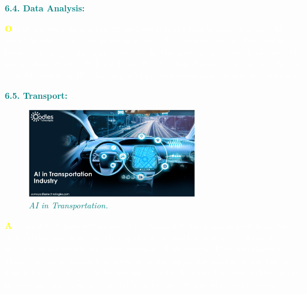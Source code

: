 \documentclass[12pt]{article}
\begin{document}
\begin{large}
\textbf{\textcolor{teal}{6.4. Data Analysis:}}\\
\end{large}
\textcolor{white}{\textbf{\textcolor{yellow}{\huge O}}ne of the ways AI will benefit business is in the field of Data Analysis. AI would be able to perceive patterns in data that humans cannot. This enables business’ to target the right customers for the product. An example of this is the partnership between IBM and Fluid. Fluid, a digital retail company uses Watson – an AI created by IBM for insightful product recommendation to its customers.}\\[5cm]

\begin{large}
\textbf{\textcolor{teal}{6.5. Transport:}}\\
\end{large}

\begin{figure}
\centering
\includegraphics[width=2.9in]{d1acc567-5be1-4738-9b8e-663b8d182bfa}

\caption{\textit{\textcolor{teal}{AI in Transportation.}}}
\end{figure}
\textcolor{white}{\textbf{\textcolor{yellow}{\huge A}}I-guided transport will no longer be confined to the pages of sci-fi literature. Self- driving cars have already populated the market, however, a driver is required at the wheels for safety purposes. With Google, Uber and General Motors trying to establish themselves at the top in this market, it will not be long before driverless vehicles become a reality. Machine Learning will be crucial in ensuring that these Automated Vehicles operate smoothly and efficiently.}\\
\end{document}
